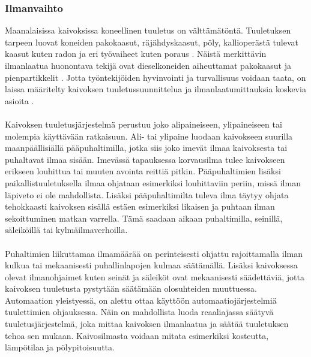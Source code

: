\documentclass[finnish,12pt,a4paper,pdftex,elec,utf8]{aaltothesis}
\begin{document}

\subsubsection{Ilmanvaihto}
Maanalaisissa kaivoksissa koneellinen tuuletus on välttämätöntä. Tuuletuksen tarpeen luovat koneiden pakokaasut, räjähdyskaasut, pöly, kallioperästä tulevat kaasut kuten radon ja eri työvaiheet kuten poraus \cite[s. 290]{Hakapää}. Näistä merkittävin ilmanlaatua huonontava tekijä ovat dieselkoneiden aiheuttamat pakokaasut ja pienpartikkelit \cite[s. 290]{Hakapää}. Jotta työntekijöiden hyvinvointi ja turvallisuus voidaan taata, on laissa määritelty kaivoksen tuuletussuunnittelua ja ilmanlaatumittauksia koskevia asioita \cite[s. 285]{Hakapää}.
\\\\
Kaivoksen tuuletusjärjestelmä perustuu joko alipaineiseen, ylipaineiseen tai molempia käyttävään ratkaisuun. Ali- tai ylipaine luodaan kaivokseen suurilla maanpäällisiällä pääpuhaltimilla, jotka siis joko imevät ilmaa kaivoksesta tai puhaltavat ilmaa sisään. Imevässä tapauksessa korvausilma tulee kaivokseen erikseen louhittua tai muuten avointa reittiä pitkin. Pääpuhaltimien lisäksi paikallistuuletuksella ilmaa ohjataan esimerkiksi louhittaviin periin, missä ilman läpiveto ei ole mahdollista. Lisäksi pääpuhaltimilta tuleva ilma täytyy ohjata tehokkaasti kaivoksen sisällä estäen esimerkiksi likaisen ja puhtaan ilman sekoittuminen matkan varrella. Tämä saadaan aikaan puhaltimilla, seinillä, säleiköillä tai kylmäilmaverhoilla.
\\\\
Puhaltimien liikuttamaa ilmamäärää on perinteisesti ohjattu rajoittamalla ilman kulkua tai mekaanisesti puhallinlapojen kulmaa säätämällä. Lisäksi kaivoksessa olevat ilmanohjaimet kuten seinät ja säleiköt ovat mekaanisesti säädettäviä, jotta kaivoksen tuuletusta pystytään säätämään olosuhteiden muuttuessa. Automaation yleistyessä, on alettu ottaa käyttöön automaatiojärjestelmiä tuulettimien ohjauksessa. Näin on mahdollista luoda reaaliajassa säätyvä tuuletusjärjestelmä, joka mittaa kaivoksen ilmanlaatua ja säätää tuuletuksen tehoa sen mukaan. Kaivosilmasta voidaan mitata esimerkiksi kosteutta, lämpötilaa ja pölypitoisuutta.
\\\\
\end{document}
